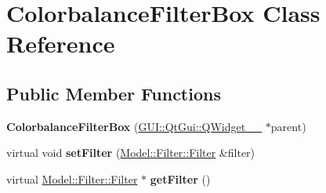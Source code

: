 \hypertarget{classGUI_1_1ColorbalanceFilterBox}{}\section{Colorbalance\+Filter\+Box Class Reference}
\label{classGUI_1_1ColorbalanceFilterBox}
\subsection*{Public Member Functions}
\begin{DoxyCompactItemize}
\item 
\hypertarget{classGUI_1_1ColorbalanceFilterBox_a06c627d9992f77eab611e23f636fd7ed}{}{\bfseries Colorbalance\+Filter\+Box} (\hyperlink{classGUI_1_1QtGui_1_1QWidget____10}{G\+U\+I\+::\+Qt\+Gui\+::\+Q\+Widget\+\_\+\+\_} $\ast$parent)\label{classGUI_1_1ColorbalanceFilterBox_a06c627d9992f77eab611e23f636fd7ed}

\item 
\hypertarget{classGUI_1_1ColorbalanceFilterBox_ad7c0ee00fe3faac7942d75eec2a5342b}{}virtual void {\bfseries set\+Filter} (\hyperlink{classModel_1_1Filter_1_1Filter}{Model\+::\+Filter\+::\+Filter} \&filter)\label{classGUI_1_1ColorbalanceFilterBox_ad7c0ee00fe3faac7942d75eec2a5342b}

\item 
\hypertarget{classGUI_1_1ColorbalanceFilterBox_acef2029a93f4ab3a538cdb643b9c2613}{}virtual \hyperlink{classModel_1_1Filter_1_1Filter}{Model\+::\+Filter\+::\+Filter} $\ast$ {\bfseries get\+Filter} ()\label{classGUI_1_1ColorbalanceFilterBox_acef2029a93f4ab3a538cdb643b9c2613}

\end{DoxyCompactItemize}
